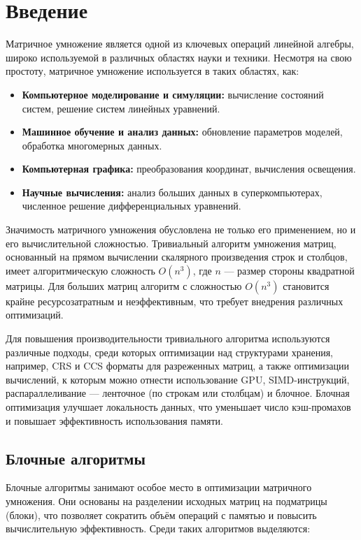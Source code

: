 \documentclass{report}
\begin{document}
\setcounter{page}{2}

\tableofcontents
\newpage

\section*{Введение}
Матричное умножение является одной из ключевых операций линейной алгебры, широко используемой в различных областях науки и техники.  Несмотря на свою простоту, матричное умножение используется в таких областях, как:

\begin{itemize}
    \item \textbf{Компьютерное моделирование и симуляции:} вычисление состояний систем, решение систем линейных уравнений.
    \item \textbf{Машинное обучение и анализ данных:} обновление параметров моделей, обработка многомерных данных.
    \item \textbf{Компьютерная графика:} преобразования координат, вычисления освещения.
    \item \textbf{Научные вычисления:} анализ больших данных в суперкомпьютерах, численное решение дифференциальных уравнений.
\end{itemize}

Значимость матричного умножения обусловлена не только его применением, но и его вычислительной сложностью. Тривиальный алгоритм умножения матриц, основанный на прямом вычислении скалярного произведения строк и столбцов, имеет алгоритмическую сложность \(O(n^3)\), где \(n\) — размер стороны квадратной матрицы. Для больших матриц алгоритм с сложностью \(O(n^3)\) становится крайне ресурсозатратным и неэффективным, что требует внедрения различных оптимизаций.

Для повышения производительности тривиального алгоритма используются различные подходы, среди которых оптимизации над структурами хранения, например, CRS и CCS форматы для разреженных матриц, а также оптимизации вычислений, к которым можно отнести использование GPU, SIMD-инструкций, распараллеливание --- ленточное (по строкам или столбцам) и блочное. Блочная оптимизация улучшает локальность данных, что уменьшает число кэш-промахов и повышает эффективность использования памяти.
\subsection*{Блочные алгоритмы}
Блочные алгоритмы занимают особое место в оптимизации матричного умножения. Они основаны на разделении исходных матриц на подматрицы (блоки), что позволяет сократить объём операций с памятью и повысить вычислительную эффективность. Среди таких алгоритмов выделяются:
\end{document}
